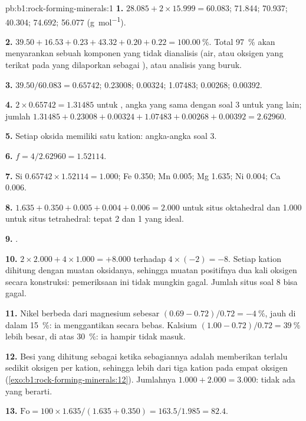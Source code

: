 \begin{solution}{pb:b1:rock-forming-minerals:1}
\textbf{1.}  $28.085 + 2\times15.999 = 60.083$;  71.844;
 70.937;  40.304;  74.692;  56.077
(\si{g.mol^{-1}}).

\textbf{2.} $39.50 + 16.53 + 0.23 + 43.32 + 0.20 + 0.22 =
\qty{100.00}{\percent}$. Total \qty{97}{\percent} akan menyarankan sebuah komponen yang tidak dianalisis (air, atau oksigen yang terikat pada  yang dilaporkan sebagai ), atau analisis yang buruk.

\textbf{3.}  $39.50/60.083 = 0.65742$;  0.23008; 
0.00324;  1.07483;  0.00268;  0.00392.

\textbf{4.} $2\times0.65742 = 1.31485$ untuk , angka yang sama dengan
soal 3 untuk yang lain; jumlah $1.31485 + 0.23008 + 0.00324 + 1.07483 +
0.00268 + 0.00392 = 2.62960$.

\textbf{5.} Setiap oksida memiliki satu kation: angka-angka soal 3.

\textbf{6.} $f = 4/2.62960 = 1.52114$.

\textbf{7.} Si $0.65742\times1.52114 = 1.000$; Fe 0.350; Mn 0.005; Mg 1.635;
Ni 0.004; Ca 0.006.

\textbf{8.} $1.635 + 0.350 + 0.005 + 0.004 + 0.006 = 2.000$ untuk situs
oktahedral dan 1.000 untuk situs tetrahedral: tepat 2 dan
1 yang ideal.

\textbf{9.} .

\textbf{10.} $2\times2.000 + 4\times1.000 = +8.000$ terhadap $4\times(-2) =
-8$. Setiap kation dihitung dengan muatan oksidanya, sehingga muatan positifnya dua kali oksigen secara konstruksi: pemeriksaan ini tidak mungkin gagal. Jumlah situs soal 8 bisa gagal.

\textbf{11.} Nikel berbeda dari magnesium sebesar
$(0.69 - 0.72)/0.72 = -\qty{4}{\percent}$, jauh di dalam \qty{15}{\percent}:
ia menggantikan secara bebas. Kalsium $(1.00 - 0.72)/0.72 = \qty{39}{\percent}$
lebih besar, di atas \qty{30}{\percent}: ia hampir tidak masuk.

\textbf{12.} Besi yang dihitung sebagai  ketika sebagiannya adalah  memberikan terlalu sedikit oksigen per kation, sehingga lebih dari tiga kation pada empat oksigen
(\cref{exo:b1:rock-forming-minerals:12}). Jumlahnya $1.000 + 2.000 = 3.000$: tidak ada
 yang berarti.

\textbf{13.} $\mathrm{Fo} = 100\times1.635/(1.635 + 0.350) = 163.5/1.985 =
82.4$.


\end{solution}
